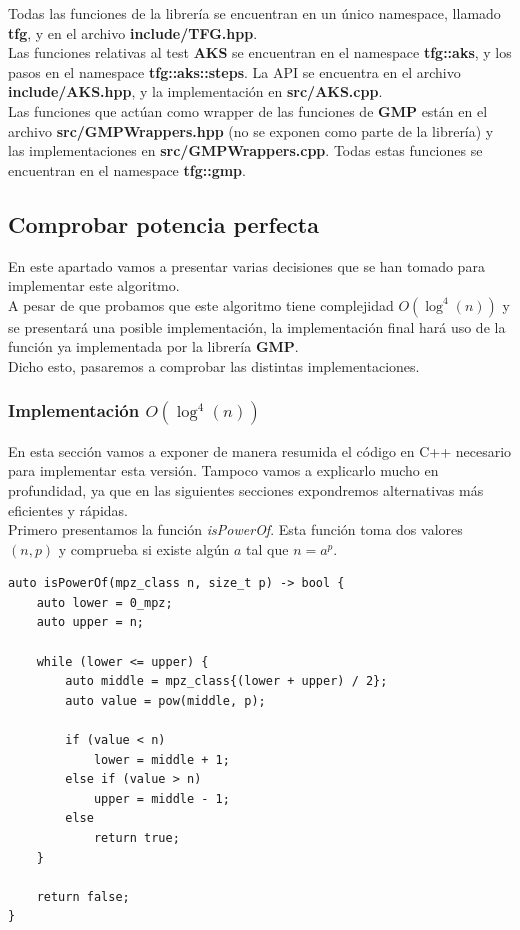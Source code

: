 Todas las funciones de la librería se encuentran en un único namespace, llamado \textbf{tfg}, y en el archivo \textbf{include/TFG.hpp}.\\

Las funciones relativas al test \textbf{AKS} se encuentran en el namespace \textbf{tfg::aks}, y los pasos en el namespace \textbf{tfg::aks::steps}. La API se encuentra en el archivo \textbf{include/AKS.hpp}, y la implementación en \textbf{src/AKS.cpp}.\\

Las funciones que actúan como wrapper de las funciones de \textbf{GMP} están en el archivo \textbf{src/GMPWrappers.hpp} (no se exponen como parte de la librería) y las implementaciones en \textbf{src/GMPWrappers.cpp}. Todas estas funciones se encuentran en el namespace \textbf{tfg::gmp}.

\subsection{Comprobar potencia perfecta}

En este apartado vamos a presentar varias decisiones que se han tomado para implementar este algoritmo.\\

A pesar de que probamos que este algoritmo tiene complejidad $O(\log^4(n))$ y se presentará una posible implementación, la implementación final hará uso de la función ya implementada por la librería \textbf{GMP}.\\

Dicho esto, pasaremos a comprobar las distintas implementaciones.

\subsubsection{Implementación $O(\log^4(n))$}

En esta sección vamos a exponer de manera resumida el código en C++ necesario para implementar esta versión. Tampoco vamos a explicarlo mucho en profundidad, ya que en las siguientes secciones expondremos alternativas más eficientes y rápidas.\\

Primero presentamos la función \textit{isPowerOf}. Esta función toma dos valores $(n, p)$ y comprueba si existe algún $a$ tal que $n = a^p$.\\

\begin{lstlisting}
auto isPowerOf(mpz_class n, size_t p) -> bool {
	auto lower = 0_mpz;
	auto upper = n;
	
	while (lower <= upper) {
		auto middle = mpz_class{(lower + upper) / 2};
		auto value = pow(middle, p);
	
		if (value < n)
			lower = middle + 1;
		else if (value > n)
			upper = middle - 1;
		else
			return true;
	}
	
	return false;
}
\end{lstlisting}

